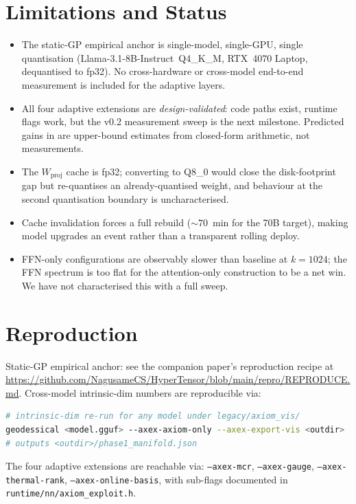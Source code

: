 \documentclass[11pt]{article}
\begin{document}
\section{Limitations and Status}
\label{sec:limits}
\begin{itemize}
\item The static-GP empirical anchor is single-model, single-GPU, single
quantisation (Llama-3.1-8B-Instruct~Q4\_K\_M, RTX~4070 Laptop, dequantised
to fp32).  No cross-hardware or cross-model end-to-end measurement is
included for the adaptive layers.
\item All four adaptive extensions are \emph{design-validated}: code paths
exist, runtime flags work, but the v0.2 measurement sweep is the next
milestone.  Predicted gains in 
are upper-bound estimates from closed-form arithmetic, not measurements.
\item The $W_\text{proj}$ cache is fp32; converting to Q8\_0
\cite{ggerganov2023kquants} would close the disk-footprint gap but
re-quantises an already-quantised weight, and behaviour at the second
quantisation boundary is uncharacterised.
\item Cache invalidation forces a full rebuild ($\sim 70$~min for the 70B
target), making model upgrades an event rather than a transparent rolling
deploy.
\item FFN-only configurations are observably slower than baseline at
$k{=}1024$; the FFN spectrum is too flat for the attention-only construction
to be a net win.  We have not characterised this with a full sweep.
\end{itemize}

\section{Reproduction}
\label{sec:repro}
Static-GP empirical anchor: see the companion paper's reproduction recipe
at \url{https://github.com/NagusameCS/HyperTensor/blob/main/repro/REPRODUCE.md}.
Cross-model intrinsic-dim numbers are reproducible via:

\begin{lstlisting}[language=bash]
# intrinsic-dim re-run for any model under legacy/axiom_vis/
geodessical <model.gguf> --axex-axiom-only --axex-export-vis <outdir>
# outputs <outdir>/phase1_manifold.json
\end{lstlisting}

The four adaptive extensions are reachable via:
\texttt{--axex-mcr}, \texttt{--axex-gauge}, \texttt{--axex-thermal-rank},
\texttt{--axex-online-basis}, with sub-flags documented in
\texttt{runtime/nn/axiom\_exploit.h}.
\end{document}
